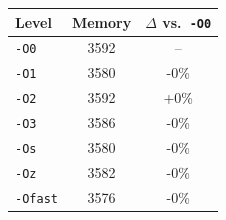 \begin{tabular*}{\columnwidth}{@{\extracolsep\fill}lcc@{\extracolsep\fill}}
\toprule
\textbf{Level} & \textbf{Memory} & \textbf{$\Delta$ vs.\ \texttt{-O0}} \\
\midrule
\texttt{-O0} & 3592 & -- \\
\texttt{-O1} & 3580 & -0\% \\
\texttt{-O2} & 3592 & +0\% \\
\texttt{-O3} & 3586 & -0\% \\
\texttt{-Os} & 3580 & -0\% \\
\texttt{-Oz} & 3582 & -0\% \\
\texttt{-Ofast} & 3576 & -0\% \\
\bottomrule
\end{tabular*}
